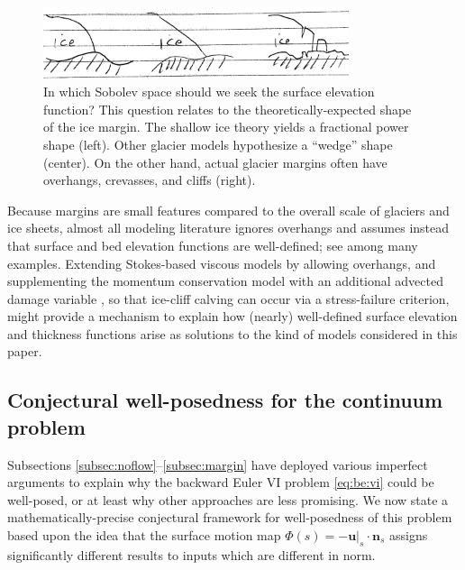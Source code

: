 \documentclass[hidelinks,onefignum,onetabnum,final]{siamart220329}  %
\newcommand{\bn}{\mathbf{n}}
\newcommand{\bu}{\mathbf{u}}
\begin{document}
\begin{figure}
\begin{center}
\includegraphics[width=0.8\textwidth]{figs/margins.jpg}
\end{center}
\caption{In which Sobolev space should we seek the surface elevation function?  This question relates to the theoretically-expected shape of the ice margin.  The shallow ice theory yields a fractional power shape (left).  Other glacier models hypothesize a ``wedge'' shape (center).  On the other hand, actual glacier margins often have overhangs, crevasses, and cliffs (right).}
\label{fig:margins}
\end{figure}

Because margins are small features compared to the overall scale of glaciers and ice sheets, almost all modeling literature ignores overhangs and assumes instead that surface and bed elevation functions are well-defined; see \cite{IsaacStadlerGhattas2015,Jouvetetal2008,LofgrenAhlkronaHelanow2022,WirbelJarosch2020} among many examples.  Extending Stokes-based viscous models by allowing overhangs, and supplementing the momentum conservation model with an additional advected damage variable \cite{PralongFunk2005}, so that ice-cliff calving can occur via a stress-failure criterion, might provide a mechanism to explain how (nearly) well-defined surface elevation and thickness functions arise as solutions to the kind of models considered in this paper.

\subsection{Conjectural well-posedness for the continuum problem} \label{subsec:conjecture} Subsections \ref{subsec:noflow}--\ref{subsec:margin} have deployed various imperfect arguments to explain why the backward Euler VI problem \eqref{eq:be:vi} could be well-posed, or at least why other approaches are less promising.  We now state a mathematically-precise conjectural framework for well-posedness of this problem based upon the idea that the surface motion map $\Phi(s) = -\bu|_s\cdot \bn_s$ assigns significantly different results to inputs which are different in norm.
\end{document}
